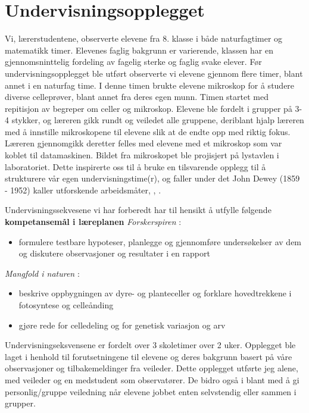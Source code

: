 \documentclass[main.tex]{subfiles}
\begin{document}
\section*{Undervisningsopplegget}
\label{sec:1}

Vi, lærerstudentene, observerte elevene fra 8. klasse i både naturfagtimer og matematikk timer. Elevenes faglig bakgrunn er varierende, 
klassen har en gjennomsninttelig fordeling av fagelig sterke og faglig svake elever. Før undervisningsopplegget ble utført observerte vi 
elevene gjennom flere timer, blant annet
i en naturfag time. I denne timen brukte elevene mikroskop for å studere diverse celleprøver, blant annet fra deres egen munn. Timen startet
med repitisjon av begreper om celler og mikroskop. Elevene ble fordelt i grupper på 3-4 stykker, og læreren gikk rundt og veiledet alle gruppene, 
deriblant hjalp læreren med å innstille mikroskopene til elevene slik at de endte opp med riktig fokus. Læreren gjennomgikk deretter 
felles med elevene med et mikroskop som var koblet til datamaskinen. Bildet fra mikroskopet ble projisjert på lystavlen i laboratoriet. 
Dette inspirerte oss til å bruke en tilsvarende opplegg til å strukturere vår egen undervisningstime(r), og faller under det John Dewey (1859 - 1952)
kaller utforskende arbeidsmåter, , .

Undervisningssekvesene vi har forberedt har til hensikt å utfylle følgende \textbf{kompetansemål i læreplanen}
\newline
\newline
\emph{Forskerspiren} :
\begin{itemize}
\vspace{-2mm}
\item formulere testbare hypoteser, planlegge og gjennomføre undersøkelser 
av dem og diskutere observasjoner og resultater i en rapport
\end{itemize}
\emph{Mangfold i naturen} :
\begin{itemize}
\vspace{-2mm}
\item beskrive oppbygningen av dyre- og planteceller og forklare hovedtrekkene i fotosyntese og celleånding
\vspace{-5mm}
\item gjøre rede for celledeling og for genetisk variasjon og arv
\end{itemize}
Undervisningseksvensene er fordelt over 3 skoletimer over 2 uker. Opplegget ble laget i henhold til forutsetningene til elevene og deres bakgrunn
basert på våre observasjoner og tilbakemeldinger fra veileder. Dette opplegget utførte jeg alene, med veileder og en medstudent som observatører. 
De bidro også i blant med å gi personlig/gruppe veiledning når elevene jobbet enten selvstendig eller sammen i grupper.
\end{document}
